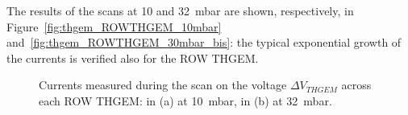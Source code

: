 \documentclass[a4paper, 11 pt]{article}
\newcommand{\Vthgem}{$\Delta V_{THGEM}$}
\begin{document}

The results of the scans at 10 and 32~mbar are shown, respectively, in Figure~\ref{fig:thgem_ROWTHGEM_10mbar} and~\ref{fig:thgem_ROWTHGEM_30mbar_bis}: the typical exponential growth of the currents is verified also for the ROW THGEM.
 

\begin{figure}[!htb]
	\centering
	\caption{Currents measured during the scan on the voltage \Vthgem{} across each ROW THGEM: in (a) at 10~mbar, in (b) at 32~mbar.}
	\label{fig:thgem_ROWTHGEM}
\end{figure}
\end{document}
